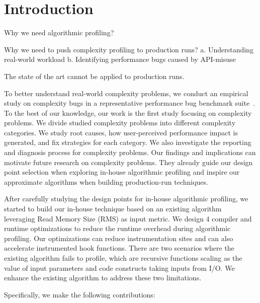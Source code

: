 \section{Introduction}
\label{sec:intro}

Why we need algorithmic profiling? 

Why we need to push complexity profiling to production runs? 
a. Understanding real-world workload
b. Identifying performance bugs caused by API-misuse

The state of the art cannot be applied to production runs. 

To better understand real-world complexity problems,
we conduct an empirical study on complexity bugs 
in a representative performance bug benchmark suite~\cite{PerfBug,SongOOPSLA2014}.
To the best of our knowledge, our work is the first study focusing on complexity problems.
We divide studied complexity problems into different complexity categories.    
We study root causes, how user-perceived performance impact is generated, 
and fix strategies for each category.
We also investigate the reporting and diagnosis process for complexity problems. 
Our findings and implications can motivate future research on complexity problems. 
They already guide our design point selection when exploring in-house algorithmic profiling 
and inspire our approximate algorithms when building production-run techniques. 

After carefully studying the design points for in-house algorithmic profiling,
we started to build our in-house technique 
based on an existing algorithm~\cite{Aprof1,Aprof2} leveraging 
Read Memory Size (RMS) as input metric. 
We design 4 compiler and runtime optimizations 
to reduce the runtime overhead during algorithmic profiling.
Our optimizations can reduce instrumentation sites 
and can also accelerate instrumented hook functions. 
There are two scenarios where the existing algorithm fails to profile, 
which are recursive functions scaling as the value of input parameters 
and code constructs taking inputs from I/O.
We enhance the existing algorithm to address these two limitations. 




Specifically, we make the following contributions:

